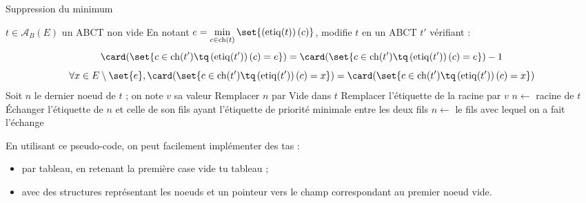 \documentclass{scrartcl}
\begin{document}
			\begin{algorithm}[H]
				\caption{Suppression du minimum}
				\Entree
				{
					$t \in \mathscr{A}_B(E)$ un ABCT non vide
				}
				\Sortie
				{
					En notant $e = \min\limits_{c \in \mathrm{ch}(t)} \set{\left(\mathrm{etiq}(t)\right)(c)}$,
					modifie $t$ en un ABCT $t'$ vérifiant :
					\[
						\card(\set{c \in \mathrm{ch}(t') \tq \left(\mathrm{etiq}(t')\right)(c) = e}) = \card(\set{c \in \mathrm{ch}(t') \tq \left(\mathrm{etiq}(t')\right)(c) = e}) - 1
					\]
					\[
						\forall x \in E\setminus\set{e}, \card(\set{c \in \mathrm{ch}(t') \tq \left(\mathrm{etiq}(t')\right)(c) = x}) = \card(\set{c \in \mathrm{ch}(t') \tq \left(\mathrm{etiq}(t')\right)(c) = x})
					\]
				}
				Soit $n$ le dernier noeud de $t$ ; on note $v$ sa valeur \;
				Remplacer $n$ par Vide dans $t$ \;
				Remplacer l'étiquette de la racine par $v$ \;
				$n \leftarrow$ racine de $t$ \;
				{
					Échanger l'étiquette de $n$ et celle de son fils ayant l'étiquette de priorité minimale entre les deux fils \;
					$n \leftarrow$ le fils avec lequel on a fait l'échange
				}
			\end{algorithm}

			En utilisant ce pseudo-code, on peut facilement implémenter des tas : 
			\begin{itemize}
				\item par tableau, en retenant la première case vide tu tableau ;
				\item avec des structures représentant les noeuds et un pointeur vers le champ correspondant au premier noeud vide.
			\end{itemize}
\end{document}
